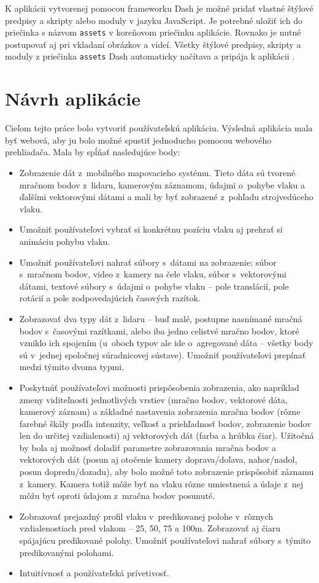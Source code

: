 K aplikácii vytvorenej pomocou frameworku Dash je možné pridať vlastné štýlové predpisy a skripty alebo moduly v jazyku JavaScript. Je potrebné uložiť ich do priečinka s názvom \texttt{assets} v koreňovom priečinku aplikácie. Rovnako je nutné postupovať aj pri vkladaní obrázkov a videí. Všetky štýlové predpisy, skripty a moduly z priečinka \texttt{assets} Dash automaticky načítava a pripája k aplikácii \cite{dash_documentation}.

\chapter{Návrh aplikácie}

Cieľom tejto práce bolo vytvoriť používateľskú aplikáciu. Výsledná aplikácia mala byť webová, aby ju bolo možné spustiť jednoducho pomocou webového prehliadača. Mala by spĺňať nasledujúce body:

\begin{itemize}
    \item Zobrazenie dát z~mobilného mapovacieho systému. Tieto dáta sú tvorené mračnom bodov z~lidaru, kamerovým záznamom, údajmi o~pohybe vlaku a ďalšími vektorovými dátami a mali by byť zobrazené z~pohľadu strojvedúceho vlaku.
    \item Umožniť používateľovi vybrať si konkrétnu pozíciu vlaku aj prehrať si animáciu pohybu vlaku.
    \item Umožniť používateľovi nahrať súbory s~dátami na zobrazenie: súbor s~mračnom bodov, video z~kamery na čele vlaku, súbor s~vektorovými dátami, textové súbory s~údajmi o~pohybe vlaku -- pole translácií, pole rotácií a pole zodpovedajúcich časových razítok.
    \item Zobrazovať dva typy dát z~lidaru -- buď malé, postupne nasnímané mračná bodov s~časovými razítkami, alebo iba jedno celistvé mračno bodov, ktoré vzniklo ich spojením (u~oboch typov ale ide o~agregované dáta -- všetky body sú v~jednej spoločnej súradnicovej sústave). Umožniť používateľovi prepínať medzi týmito dvoma typmi.
    \item Poskytnúť používateľovi možnosti prispôsobenia zobrazenia, ako napríklad zmeny viditeľnosti jednotlivých vrstiev (mračno bodov, vektorové dáta, kamerový záznam) a základné nastavenia zobrazenia mračna bodov (rôzne farebné škály podľa intenzity, veľkosť a priehľadnosť bodov, zobrazenie bodov len do určitej vzdialenosti) aj vektorových dát (farba a hrúbka čiar). Užitočná by bola aj možnosť doladiť parametre zobrazovania mračna bodov a vektorových dát (posun aj otočenie kamery doprava/doľava, nahor/nadol, posun dopredu/dozadu), aby bolo možné toto zobrazenie prispôsobiť záznamu z~kamery. Kamera totiž môže byť na vlaku rôzne umiestnená a údaje z~nej môžu byť oproti údajom z~mračna bodov posunuté.
    \item Zobrazovať prejazdný profil vlaku v~predikovanej polohe v~rôznych vzdialenostiach pred vlakom -- 25, 50, 75 a 100m. Zobrazovať aj čiaru spájajúcu predikované polohy. Umožniť používateľovi nahrať súbory s~týmito predikovanými polohami.
    \item Intuitívnosť a používateľská prívetivosť.

\end{itemize}

